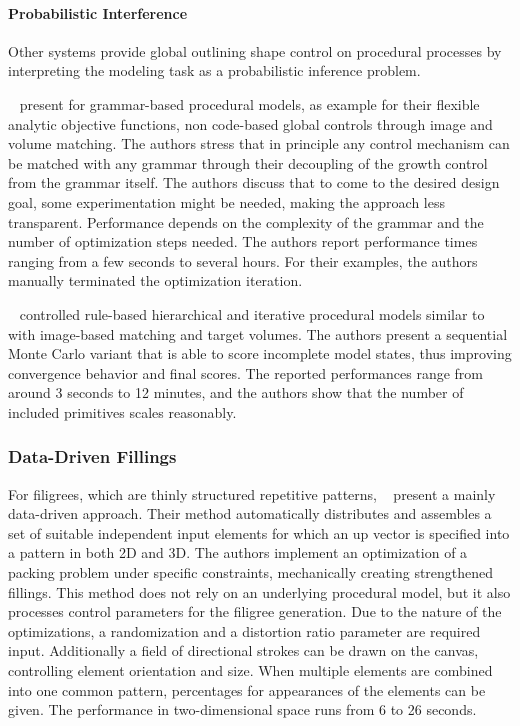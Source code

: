 \paragraph{Probabilistic Interference}

Other systems provide global outlining shape control on procedural processes by interpreting the modeling task as a probabilistic inference problem.

\citeauthor*{talton_2011_mpm}~\cite{talton_2011_mpm} present for grammar-based procedural models, as example for their flexible analytic objective functions, non code-based global controls through image and volume matching. The authors stress that in principle any control mechanism can be matched with any grammar through their decoupling of the growth control from the grammar itself. The authors discuss that to come to the desired design goal, some experimentation might be needed, making the approach less transparent. Performance depends on the complexity of the grammar and the number of optimization steps needed. The authors report performance times ranging from a few seconds to several hours. For their examples, the authors manually terminated the optimization iteration.

\citeauthor*{ritchie_2015_cpm}~\cite{ritchie_2015_cpm} controlled rule-based hierarchical and iterative procedural models similar to \citeauthor*{talton_2011_mpm}~\cite{talton_2011_mpm} with image-based matching and target volumes. The authors present a sequential Monte Carlo variant that is able to score incomplete model states, thus improving convergence behavior and final scores. The reported performances range from around 3 seconds to 12 minutes, and the authors show that the number of included primitives scales reasonably.



\subsubsection{Data-Driven Fillings}

For filigrees, which are thinly structured repetitive patterns, \citeauthor*{chen_2016_sof}~\cite{chen_2016_sof} present a mainly data-driven approach. Their method automatically distributes and assembles a set of suitable independent input elements for which an up vector is specified into a pattern in both 2D and 3D. The authors implement an optimization of a packing problem under specific constraints, mechanically creating strengthened fillings. This method does not rely on an underlying procedural model, but it also processes control parameters for the filigree generation. Due to the nature of the optimizations, a randomization and a distortion ratio parameter are required input. Additionally a field of directional strokes can be drawn on the canvas, controlling element orientation and size. When multiple elements are combined into one common pattern, percentages for appearances of the elements can be given. The performance in two-dimensional space runs from 6 to 26 seconds.

